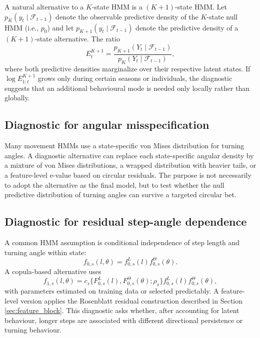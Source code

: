 \documentclass[pdflatex,sn-basic]{sn-jnl}
\theoremstyle{thmstyleone}
\theoremstyle{thmstyletwo}
\theoremstyle{thmstylethree}
\newcommand{\1}{\mathbf 1}
\newcommand{\calF}{\mathcal F}
\begin{document}
A natural alternative to a $K$-state HMM is a $(K+1)$-state HMM. Let $p_K(y_t\mid\calF_{t-1})$ denote the observable predictive density of the $K$-state null HMM (i.e., $p_0$) and let $p_{K+1}(y_t\mid\calF_{t-1})$ denote the predictive density of a $(K+1)$-state alternative. The ratio
\begin{equation}
 E_t^{K+1}=\frac{p_{K+1}(Y_t\mid\calF_{t-1})}{p_K(Y_t\mid\calF_{t-1})},
\end{equation}
where both predictive densities marginalize over their respective latent states. If $\log E_{1:t}^{K+1}$ grows only during certain seasons or individuals, the diagnostic suggests that an additional behavioural mode is needed only locally rather than globally.

\subsection{Diagnostic for angular misspecification}

Many movement HMMs use a state-specific von Mises distribution for turning angles. A diagnostic alternative can replace each state-specific angular density by a mixture of von Mises distributions, a wrapped distribution with heavier tails, or a feature-level e-value based on circular residuals. The purpose is not necessarily to adopt the alternative as the final model, but to test whether the null predictive distribution of turning angles can survive a targeted circular bet.

\subsection{Diagnostic for residual step-angle dependence}

A common HMM assumption is conditional independence of step length and turning angle within state:
\begin{equation}
 f_{0,s}(l,\theta)=f^L_{0,s}(l)f^\Theta_{0,s}(\theta).
\end{equation}
A copula-based alternative uses
\begin{equation}
 f_{1,s}(l,\theta)=c_s\{F^L_{0,s}(l),F^\Theta_{0,s}(\theta);\rho_s\}f^L_{0,s}(l)f^\Theta_{0,s}(\theta),
\end{equation}
with parameters estimated on training data or selected predictably. A feature-level version applies the Rosenblatt residual construction described in Section \ref{sec:feature_block}. This diagnostic asks whether, after accounting for latent behaviour, longer steps are associated with different directional persistence or turning behaviour.
\end{document}
